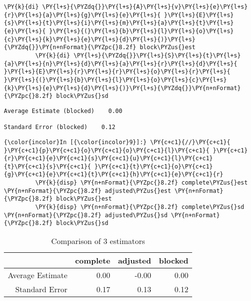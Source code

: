 \documentclass[11pt,notitlepage]{article}\usepackage[]{graphicx}\usepackage[]{color}
\makeatletter
\newenvironment{kframe}{%
 \def\at@end@of@kframe{}%
 \ifinner\ifhmode%
  \def\at@end@of@kframe{\end{minipage}}%
  \begin{minipage}{\columnwidth}%
 \fi\fi%
 \def\FrameCommand##1{\hskip\@totalleftmargin \hskip-\fboxsep
 \colorbox{shadecolor}{##1}\hskip-\fboxsep
     \hskip-\linewidth \hskip-\@totalleftmargin \hskip\columnwidth}%
 \MakeFramed {\advance\hsize-\width
   \@totalleftmargin\z@ \linewidth\hsize
   \@setminipage}}%
 {\par\unskip\endMakeFramed%
 \at@end@of@kframe}
\newenvironment{knitrout}{}{} %
\makeatother
\begin{document}
\begin{enumerate}[a)]
\begin{knitrout}
\begin{kframe}
\begin{Verbatim}[commandchars=\\\{\}]
         \PY{k}{di} \PY{l+s}{\PYZdq{}}\PY{l+s}{A}\PY{l+s}{v}\PY{l+s}{e}\PY{l+s}{r}\PY{l+s}{a}\PY{l+s}{g}\PY{l+s}{e}\PY{l+s}{ }\PY{l+s}{E}\PY{l+s}{s}\PY{l+s}{t}\PY{l+s}{i}\PY{l+s}{m}\PY{l+s}{a}\PY{l+s}{t}\PY{l+s}{e}\PY{l+s}{ }\PY{l+s}{(}\PY{l+s}{b}\PY{l+s}{l}\PY{l+s}{o}\PY{l+s}{c}\PY{l+s}{k}\PY{l+s}{e}\PY{l+s}{d}\PY{l+s}{)}\PY{l+s}{\PYZdq{}}\PY{n+nFormat}{\PYZpc{}8.2f} block\PYZus{}est
         \PY{k}{di} \PY{l+s}{\PYZdq{}}\PY{l+s}{S}\PY{l+s}{t}\PY{l+s}{a}\PY{l+s}{n}\PY{l+s}{d}\PY{l+s}{a}\PY{l+s}{r}\PY{l+s}{d}\PY{l+s}{ }\PY{l+s}{E}\PY{l+s}{r}\PY{l+s}{r}\PY{l+s}{o}\PY{l+s}{r}\PY{l+s}{ }\PY{l+s}{(}\PY{l+s}{b}\PY{l+s}{l}\PY{l+s}{o}\PY{l+s}{c}\PY{l+s}{k}\PY{l+s}{e}\PY{l+s}{d}\PY{l+s}{)}\PY{l+s}{\PYZdq{}}\PY{n+nFormat}{\PYZpc{}8.2f} block\PYZus{}sd
\end{Verbatim}

    \begin{Verbatim}[commandchars=\\\{\}]
Average Estimate (blocked)    0.00

Standard Error (blocked)    0.12

    \end{Verbatim}

    \begin{Verbatim}[commandchars=\\\{\}]
{\color{incolor}In [{\color{incolor}9}]:} \PY{c+c1}{//}\PY{c+c1}{ }\PY{c+c1}{p}\PY{c+c1}{o}\PY{c+c1}{o}\PY{c+c1}{l}\PY{c+c1}{ }\PY{c+c1}{r}\PY{c+c1}{e}\PY{c+c1}{s}\PY{c+c1}{u}\PY{c+c1}{l}\PY{c+c1}{t}\PY{c+c1}{s}\PY{c+c1}{ }\PY{c+c1}{t}\PY{c+c1}{o}\PY{c+c1}{g}\PY{c+c1}{e}\PY{c+c1}{t}\PY{c+c1}{h}\PY{c+c1}{e}\PY{c+c1}{r}
         \PY{k}{disp} \PY{n+nFormat}{\PYZpc{}8.2f} complete\PYZus{}est \PY{n+nFormat}{\PYZpc{}8.2f} adjusted\PYZus{}est \PY{n+nFormat}{\PYZpc{}8.2f} block\PYZus{}est
         \PY{k}{disp} \PY{n+nFormat}{\PYZpc{}8.2f} complete\PYZus{}sd \PY{n+nFormat}{\PYZpc{}8.2f} adjusted\PYZus{}sd \PY{n+nFormat}{\PYZpc{}8.2f} block\PYZus{}sd
\end{Verbatim}
\end{kframe}
\end{knitrout}


\begin{table}[H]
\centering
\caption{Comparison of 3 estimators} 
\begin{tabular}{rrrr}
  \hline
 & complete & adjusted & blocked \\ 
  \hline
Average Estimate & 0.00 & -0.00 & 0.00 \\ 
  Standard Error & 0.17 & 0.13 & 0.12 \\ 
   \hline
\end{tabular}
\end{table}



\end{enumerate}
\end{document}
